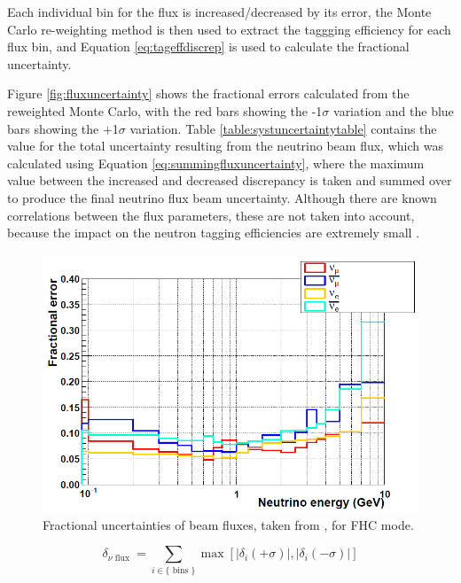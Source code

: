 Each individual bin for the flux is increased/decreased by its error, the Monte Carlo re-weighting method is then used to extract the taggging efficiency for each flux bin, and Equation \ref{eq:tageffdiscrep} is used to calculate the fractional uncertainty.



Figure \ref{fig:fluxuncertainty} shows the fractional errors calculated from the reweighted Monte Carlo, with the red bars showing the -1$\sigma$ variation and the blue bars showing the +1$\sigma$ variation. Table \ref{table:systuncertaintytable} contains the value for the total uncertainty resulting from the neutrino beam flux, which was calculated using Equation \ref{eq:summingfluxuncertainty}, where the maximum value between the increased and decreased discrepancy is taken and summed over to produce the final neutrino flux beam uncertainty.
Although there are known correlations between the flux parameters, these are not taken into account, because the impact on the neutron tagging efficiencies are extremely small \cite{akutsu_thesis}.
\newline

\begin{figure}[!htb]
    \includegraphics[width=\textwidth]{Figures/frac_beam_flux_uncertainty.png}
    \caption{Fractional uncertainties of beam fluxes, taken from \cite{tn415_fiacob}, for FHC mode. }
    \label{fig:frac_beam_flux_uncertainty}
\end{figure}


\begin{equation}
    \delta_{\nu \text { flux }}=\sum_{i \in\{\text { bins }\}} \max \left[\left|\delta_{i}(+\sigma)\right|,\left|\delta_{i}(-\sigma)\right|\right]
 \label{eq:summingfluxuncertainty}   
\end{equation}

